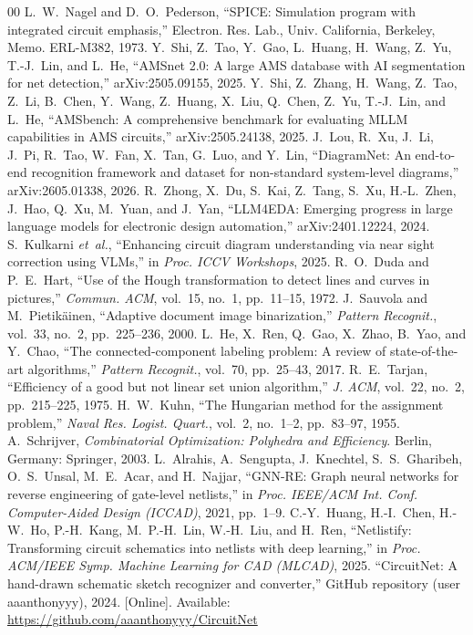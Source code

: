 \documentclass[journal]{IEEEtran}
\begin{document}
\begin{thebibliography}{00}
 L.~W.~Nagel and D.~O.~Pederson, ``SPICE: Simulation program with integrated circuit emphasis,'' Electron. Res. Lab., Univ. California, Berkeley, Memo. ERL-M382, 1973.
 Y.~Shi, Z.~Tao, Y.~Gao, L.~Huang, H.~Wang, Z.~Yu, T.-J.~Lin, and L.~He, ``AMSnet 2.0: A large AMS database with AI segmentation for net detection,'' arXiv:2505.09155, 2025.
 Y.~Shi, Z.~Zhang, H.~Wang, Z.~Tao, Z.~Li, B.~Chen, Y.~Wang, Z.~Huang, X.~Liu, Q.~Chen, Z.~Yu, T.-J.~Lin, and L.~He, ``AMSbench: A comprehensive benchmark for evaluating MLLM capabilities in AMS circuits,'' arXiv:2505.24138, 2025.
 J.~Lou, R.~Xu, J.~Li, J.~Pi, R.~Tao, W.~Fan, X.~Tan, G.~Luo, and Y.~Lin, ``DiagramNet: An end-to-end recognition framework and dataset for non-standard system-level diagrams,'' arXiv:2605.01338, 2026.
 R.~Zhong, X.~Du, S.~Kai, Z.~Tang, S.~Xu, H.-L.~Zhen, J.~Hao, Q.~Xu, M.~Yuan, and J.~Yan, ``LLM4EDA: Emerging progress in large language models for electronic design automation,'' arXiv:2401.12224, 2024.
 S.~Kulkarni \textit{et~al.}, ``Enhancing circuit diagram understanding via near sight correction using VLMs,'' in \textit{Proc. ICCV Workshops}, 2025.
 R.~O.~Duda and P.~E.~Hart, ``Use of the Hough transformation to detect lines and curves in pictures,'' \textit{Commun. ACM}, vol.~15, no.~1, pp.~11--15, 1972.
 J.~Sauvola and M.~Pietik\"{a}inen, ``Adaptive document image binarization,'' \textit{Pattern Recognit.}, vol.~33, no.~2, pp.~225--236, 2000.
 L.~He, X.~Ren, Q.~Gao, X.~Zhao, B.~Yao, and Y.~Chao, ``The connected-component labeling problem: A review of state-of-the-art algorithms,'' \textit{Pattern Recognit.}, vol.~70, pp.~25--43, 2017.
 R.~E.~Tarjan, ``Efficiency of a good but not linear set union algorithm,'' \textit{J. ACM}, vol.~22, no.~2, pp.~215--225, 1975.
 H.~W.~Kuhn, ``The Hungarian method for the assignment problem,'' \textit{Naval Res. Logist. Quart.}, vol.~2, no.~1--2, pp.~83--97, 1955.
 A.~Schrijver, \textit{Combinatorial Optimization: Polyhedra and Efficiency}. Berlin, Germany: Springer, 2003.
 L.~Alrahis, A.~Sengupta, J.~Knechtel, S.~S.~Gharibeh, O.~S.~Unsal, M.~E.~Acar, and H.~Najjar, ``GNN-RE: Graph neural networks for reverse engineering of gate-level netlists,'' in \textit{Proc. IEEE/ACM Int. Conf. Computer-Aided Design (ICCAD)}, 2021, pp.~1--9.
 C.-Y.~Huang, H.-I.~Chen, H.-W.~Ho, P.-H.~Kang, M.~P.-H.~Lin, W.-H.~Liu, and H.~Ren, ``Netlistify: Transforming circuit schematics into netlists with deep learning,'' in \textit{Proc. ACM/IEEE Symp. Machine Learning for CAD (MLCAD)}, 2025.
 ``CircuitNet: A hand-drawn schematic sketch recognizer and converter,'' GitHub repository (user aaanthonyyy), 2024. [Online]. Available: \url{https://github.com/aaanthonyyy/CircuitNet}
\end{thebibliography}
\end{document}
